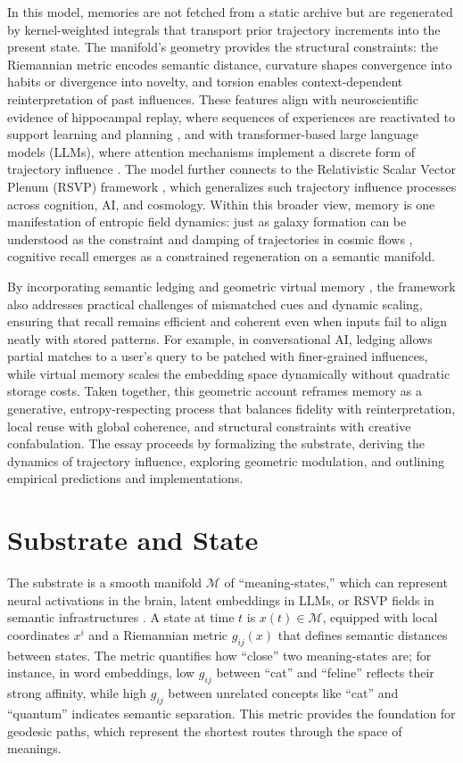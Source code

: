 \documentclass[a4paper,12pt]{article}
\newcommand{\M}{\mathcal{M}}
\begin{document}
In this model, memories are not fetched from a static archive but are regenerated by kernel-weighted integrals that transport prior trajectory increments into the present state. The manifold’s geometry provides the structural constraints: the Riemannian metric encodes semantic distance, curvature shapes convergence into habits or divergence into novelty, and torsion enables context-dependent reinterpretation of past influences. These features align with neuroscientific evidence of hippocampal replay, where sequences of experiences are reactivated to support learning and planning \citep{hassabis2007patients}, and with transformer-based large language models (LLMs), where attention mechanisms implement a discrete form of trajectory influence \citep{vaswani2017attention}. The model further connects to the Relativistic Scalar Vector Plenum (RSVP) framework \citep{semantic2025}, which generalizes such trajectory influence processes across cognition, AI, and cosmology. Within this broader view, memory is one manifestation of entropic field dynamics: just as galaxy formation can be understood as the constraint and damping of trajectories in cosmic flows \citep{weinberg2008cosmology}, cognitive recall emerges as a constrained regeneration on a semantic manifold.

By incorporating semantic ledging and geometric virtual memory \citep{kuijper2021geometric}, the framework also addresses practical challenges of mismatched cues and dynamic scaling, ensuring that recall remains efficient and coherent even when inputs fail to align neatly with stored patterns. For example, in conversational AI, ledging allows partial matches to a user's query to be patched with finer-grained influences, while virtual memory scales the embedding space dynamically without quadratic storage costs. Taken together, this geometric account reframes memory as a generative, entropy-respecting process that balances fidelity with reinterpretation, local reuse with global coherence, and structural constraints with creative confabulation. The essay proceeds by formalizing the substrate, deriving the dynamics of trajectory influence, exploring geometric modulation, and outlining empirical predictions and implementations.

\section{Substrate and State}
The substrate is a smooth manifold $\M$ of ``meaning-states,'' which can represent neural activations in the brain, latent embeddings in LLMs, or RSVP fields in semantic infrastructures \citep{semantic2025}. A state at time $t$ is $x(t) \in \M$, equipped with local coordinates $x^i$ and a Riemannian metric $g_{ij}(x)$ that defines semantic distances between states. The metric quantifies how ``close'' two meaning-states are; for instance, in word embeddings, low $g_{ij}$ between ``cat'' and ``feline'' reflects their strong affinity, while high $g_{ij}$ between unrelated concepts like ``cat'' and ``quantum'' indicates semantic separation. This metric provides the foundation for geodesic paths, which represent the shortest routes through the space of meanings.
\end{document}
